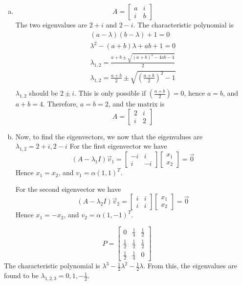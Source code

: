 \vspace{2mm}
\begin{enumerate}[a)]
  \item
$$
A=\left[\begin{array}{cc}a&i\\i&b\end{array}\right]
$$
The two eigenvalues are $2+i$ and $2-i$. The characteristic polynomial is
\begin{eqnarray*}
  (a-\lambda)(b-\lambda)+1=0\\
	\lambda^2-(a+b)\lambda+ab+1=0\\
	\lambda_{1,2}=\frac{a+b\pm\sqrt{(a+b)^2-4ab-4}}{2}\\
	\lambda_{1,2}=\frac{a+b}{2}\pm\sqrt{\left(\frac{a+b}{2}\right)^2-1}\\
\end{eqnarray*}
$\lambda_{1,2}$ should be $2\pm i$. This is only possible if $\left(\frac{a+b}{2}\right)=0$, hence $a=b$, and $a+b=4$. Therefore, $a=b=2$, and the matrix is
$$
A=\left[\begin{array}{cc}2&i\\i&2\end{array}\right]
$$
\item Now, to find the eigenvectors, we now that the eigenvalues are $\lambda_{1,2}=2+i,2-i$
For the first eigenvector we have
$$
(A-\lambda_1 I)\vec{v}_1=\left[\begin{array}{cc}-i&i\\i&-i\end{array}\right]\left[\begin{array}{c}x_1\\x_2\end{array}\right]=\vec{0}
$$
Hence $x_1=x_2$, and $v_1=\alpha(1,1)^T$.

For the second eigenvector we have
$$
(A-\lambda_2 I)\vec{v}_2=\left[\begin{array}{cc}i&i\\i&i\end{array}\right]\left[\begin{array}{c}x_1\\x_2\end{array}\right]=\vec{0}
$$
Hence $x_1=-x_2$, and $v_2=\alpha(1,-1)^T$.


\end{enumerate}

\vspace{2mm}
$$
P=\left[\begin{array}{ccc}
				0&\frac{1}{4}&\frac{1}{2}\\ \frac{1}{2}&\frac{1}{2}&\frac{1}{2}\\ \frac{1}{2}&\frac{1}{4}&0
        \end{array}
  \right]
$$
The characteristic polynomial is $\lambda^3-\frac{1}{2}\lambda^2-\frac{1}{2}\lambda$. From this, the eigenvalues are found to be $\lambda_{1,2,3}=0,1,-\frac{1}{2}$.

